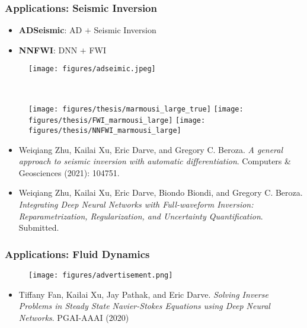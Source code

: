 \documentclass[usenames,dvipsnames]{beamer}
\begin{document}
\begin{frame}
	\frametitle{Applications: Seismic Inversion}
	\begin{itemize}
		\item \textbf{ADSeismic}: AD $+$ Seismic Inversion
		\item \textbf{NNFWI}: DNN $+$ FWI
	\end{itemize}

\begin{minipage}[t]{0.7\textwidth}
		\begin{figure}[hbt]
		\centering
		\texttt{[image: figures/adseimic.jpeg]}
	\end{figure}
\end{minipage}~
\begin{minipage}[t]{0.3\textwidth}
	\begin{figure}[hbt]
		\texttt{[image: figures/thesis/marmousi\_large\_true]}
				\texttt{[image: figures/thesis/FWI\_marmousi\_large]}
						\texttt{[image: figures/thesis/NNFWI\_marmousi\_large]}
	\end{figure}
\end{minipage}

		
	\vspace{-0.2cm}
	{
		\tiny
		
		\begin{itemize}
			\item[] Weiqiang Zhu, Kailai Xu, Eric Darve, and Gregory C. Beroza. \textit{A general approach to seismic inversion with automatic differentiation}. Computers \& Geosciences (2021): 104751.
			\item[] Weiqiang Zhu, Kailai Xu, Eric Darve, Biondo Biondi, and Gregory C. Beroza. \textit{Integrating Deep Neural Networks with Full-waveform Inversion: Reparametrization, Regularization, and Uncertainty Quantification}. Submitted.
		\end{itemize}
		
		
		
	}
\end{frame}

\begin{frame}
	\frametitle{Applications: Fluid Dynamics}
	
	\begin{figure}[hbt]
		\centering 
		\texttt{[image: figures/advertisement.png]}
	\end{figure}

	\vspace{-0.2cm}
{
	\tiny
	
	\begin{itemize}
		\item[] Tiffany Fan, Kailai Xu, Jay Pathak, and Eric Darve. \textit{Solving Inverse Problems in Steady State Navier-Stokes Equations using Deep Neural Networks}. PGAI-AAAI (2020)
	\end{itemize}
}

\end{frame}
\end{document}
